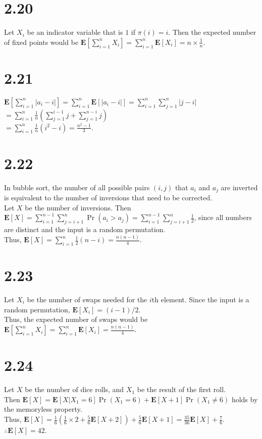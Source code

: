 \documentclass{article}
\begin{document}
\section*{2.20}
Let $X_i$ be an indicator variable that is $1$ if $\pi(i)=i$.
Then the expected number of fixed points would be $\textbf{E}[\sum\limits_{i=1}^nX_i]=\sum\limits_{i=1}^n\textbf{E}[X_i]=n\times\frac{1}{n}$.
\section*{2.21}
$\textbf{E}[\sum\limits_{i=1}^{n} |a_i -i|] = \sum\limits_{i=1}^{n} \textbf{E}[|a_i - i|]=\sum\limits_{i=1}^n\sum\limits_{j=1}^n|j-i|$
$=\sum\limits_{i=1}^n\frac{1}{n}(\sum\limits_{j=1}^{i-1}j+\sum\limits_{j=1}^{n-i}j)$\\
$=\sum\limits_{i=1}^n\frac{1}{n}(i^2-i)=\frac{n^2-1}{3}$.
\section*{2.22}
In bubble sort, the number of all possible pairs $(i,j)$ that $a_i$ and $a_j$ are inverted is equivalent to the number of inversions that need to be corrected.\\
Let $X$ be the number of inversions.
Then $\textbf{E}[X]=\sum\limits_{i=1}^{n-1}\sum\limits_{j=i+1}^n\Pr(a_i>a_j)=\sum\limits_{i=1}^{n-1}\sum\limits_{j=i+1}^n\frac{1}{2}$,
since all numbers are distinct and the input is a random permutation.\\
Thus, $\textbf{E}[X]=\sum\limits_{i=1}^n\frac{1}{2}(n-i)=\frac{n(n-1)}{4}$.
\section*{2.23}
Let $X_i$ be the number of swaps needed for the $i$th element. Since the input is a random permutation, $\textbf{E}[X_i]=(i-1)/2$.\\
Thus, the expected number of swaps would be $\textbf{E}[\sum\limits_{i=1}^{n}X_i]=\sum\limits_{i=1}^n\textbf{E}[X_i]=\frac{n(n-1)}{4}$.
\section*{2.24}
Let $X$ be the number of dice rolls, and $X_1$ be the result of the first roll.\\
Then $\textbf{E}[X]=\textbf{E}[X|X_1=6]\Pr(X_1=6)+\textbf{E}[X+1]\Pr(X_1\neq 6)$ holds by the memoryless property.\\
Thus, $\textbf{E}[X]=\frac{1}{6}(\frac{1}{6}\times2+\frac{5}{6}\textbf{E}[X+2])+\frac{5}{6}\textbf{E}[X+1]=\frac{35}{36}\textbf{E}[X]+\frac{7}{6}$.
$\therefore \textbf{E}[X]=42$.
\end{document}
